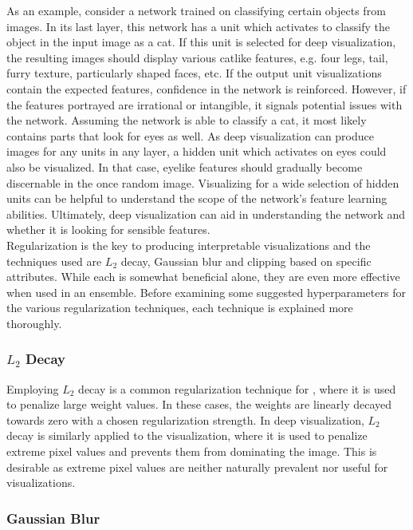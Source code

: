 \noindent As an example, consider a network trained on classifying certain objects from images. In its last layer, this network has a unit which activates to classify the object in the input image as a cat. If this unit is selected for deep visualization, the resulting images should display various catlike features, e.g. four legs, tail, furry texture, particularly shaped faces, etc. If the output unit visualizations contain the expected features, confidence in the network is reinforced. However, if the features portrayed are irrational or intangible, it signals potential issues with the network. Assuming the network is able to classify a cat, it most likely contains parts that look for eyes as well. As deep visualization can produce images for any units in any layer, a hidden unit which activates on eyes could also be visualized. In that case, eyelike features should gradually become discernable in the once random image. Visualizing for a wide selection of hidden units can be helpful to understand the scope of the network's feature learning abilities. Ultimately, deep visualization can aid in understanding the network and whether it is looking for sensible features. \\

\noindent Regularization is the key to producing interpretable visualizations and the techniques used are $L_2$ decay, Gaussian blur and clipping based on specific attributes. While each is somewhat beneficial alone, they are even more effective when used in an ensemble. Before examining some suggested hyperparameters for the various regularization techniques, each technique is explained more thoroughly.

\subsubsection{$L_2$ Decay}

Employing $L_2$ decay is a common regularization technique for , where it is used to penalize large weight values. In these cases, the weights are linearly decayed towards zero with a chosen regularization strength. In deep visualization, $L_2$ decay is similarly applied to the visualization, where it is used to penalize extreme pixel values and prevents them from dominating the image. This is desirable as extreme pixel values are neither naturally prevalent nor useful for visualizations.

\subsubsection{Gaussian Blur}

